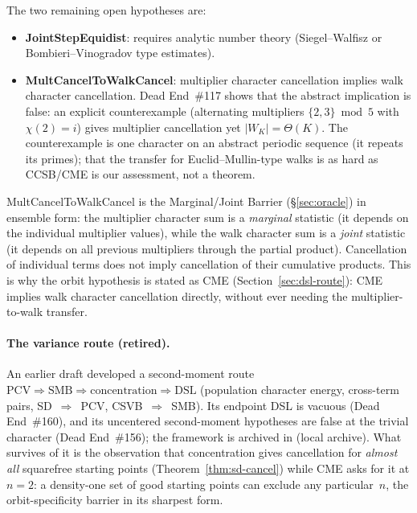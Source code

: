The two remaining open hypotheses are:
\begin{itemize}[nosep]
\item \textbf{JointStepEquidist}: requires analytic number theory
  (Siegel--Walfisz or Bombieri--Vinogradov type estimates).
\item \textbf{MultCancelToWalkCancel}: multiplier character cancellation
  implies walk character cancellation.  Dead End~\#117 shows that the
  abstract implication is false: an explicit counterexample
  (alternating multipliers $\{2, 3\} \bmod 5$ with $\chi(2) = i$) gives
  multiplier cancellation yet $|W_K| = \Theta(K)$.  The counterexample
  is one character on an abstract periodic sequence (it repeats its
  primes); that the transfer for Euclid--Mullin-type walks is as hard
  as CCSB/CME is our assessment, not a theorem.
\end{itemize}

\noindent MultCancelToWalkCancel is the Marginal/Joint Barrier
(\S\ref{sec:oracle}) in ensemble form: the multiplier character sum is a
\emph{marginal} statistic (it depends on the individual multiplier
values), while the walk character sum is a \emph{joint} statistic (it
depends on all previous multipliers through the partial product).
Cancellation of individual terms does not imply cancellation of their
cumulative products.  This is why the orbit hypothesis is stated as
CME (Section~\ref{sec:dsl-route}): CME implies walk character
cancellation directly, without ever needing the multiplier-to-walk
transfer.

\paragraph{The variance route (retired).}
\label{sec:variance-route}
An earlier draft developed a second-moment route
$\mathrm{PCV} \Rightarrow \mathrm{SMB} \Rightarrow \text{concentration}
\Rightarrow \mathrm{DSL}$ (population character energy, cross-term pairs,
SD~$\Rightarrow$~PCV, CSVB~$\Rightarrow$~SMB).  Its endpoint DSL is
vacuous (Dead End~\#160), and its uncentered second-moment hypotheses
are false at the trivial character (Dead End~\#156); the framework is
archived in  (local archive).  What
survives of it is the observation that concentration gives cancellation
for \emph{almost all} squarefree starting points
(Theorem~\ref{thm:sd-cancel}) while CME asks for it at $n = 2$: a
density-one set of good starting points can exclude any particular~$n$,
the orbit-specificity barrier in its sharpest form.

